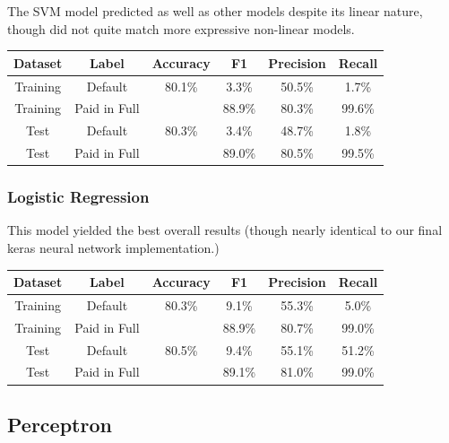 The SVM model predicted as well as other models despite its linear nature, though did not quite match more expressive non-linear models.

        \begin{center}
        \begin{tabular}{| c | c || c | c | c | c |}
        \hline
        Dataset & Label & Accuracy & F1 & Precision & Recall \\
        \hline \hline
         Training & Default         & 80.1\% & 3.3\% & 50.5\% & 1.7\% \\
         Training & Paid in Full    &       & 88.9\% & 80.3\% & 99.6\% \\
         \hline
         Test & Default             & 80.3\% & 3.4\% & 48.7\% & 1.8\% \\
         Test & Paid in Full        &       & 89.0\% & 80.5\% & 99.5\% \\
         \hline
        \end{tabular}
        \end{center}

\subsubsection{Logistic Regression}

This model yielded the best overall results (though nearly identical to our final keras neural network implementation.)

        \begin{center}
        \begin{tabular}{| c | c || c | c | c | c |}
        \hline
        Dataset & Label & Accuracy & F1 & Precision & Recall \\
        \hline \hline
         Training & Default         & 80.3\% & 9.1\% & 55.3\% & 5.0\% \\
         Training & Paid in Full    &       & 88.9\% & 80.7\% & 99.0\% \\
         \hline
         Test & Default             & 80.5\% & 9.4\% & 55.1\% & 51.2\% \\
         Test & Paid in Full        &       & 89.1\% & 81.0\% & 99.0\% \\
         \hline
        \end{tabular}
        \end{center}

\subsection{Perceptron}

